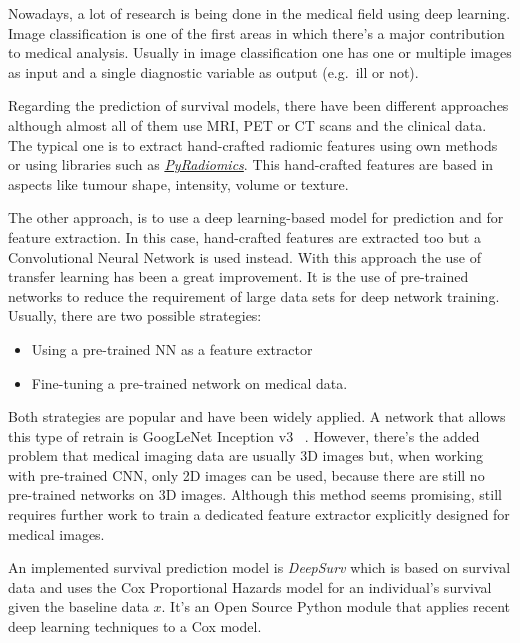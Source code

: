 Nowadays, a lot of research is being done in the medical field using deep learning. Image
classification is one of the first areas in which there's a major contribution to medical analysis.
Usually in image classification one has one or multiple images as input and a single diagnostic 
variable as output (e.g.~ill or not).
~\cite{medical:survey-deep-learning}

Regarding the prediction of survival models, there have been different approaches although
almost all of them use MRI, PET or CT scans and the clinical data. The typical one is to extract
hand-crafted radiomic features using own methods or using libraries such as
\href{https://github.com/Radiomics/pyradiomics}{\emph{PyRadiomics}}. This hand-crafted 
features are based in aspects like tumour shape, intensity, volume or texture.
~\cites{medical:tumour-radiomics}{medical:PyRadiomics}

The other approach, is to use a deep learning-based model for prediction and for feature
extraction. In this case, hand-crafted features are extracted too but a Convolutional
Neural Network is used instead. With this approach the use of transfer learning has been a
great improvement. It is the use of pre-trained networks to reduce the requirement of large data
sets for deep network training. Usually, there are two possible strategies: 
\begin{itemize}[noitemsep, topsep=0pt]
  \item Using a pre-trained NN as a feature extractor
  \item Fine-tuning a pre-trained network on medical data.
\end{itemize}

Both strategies are popular and have been widely applied. A network that allows this type
of retrain is GoogLeNet Inception v3
~\cites{neural:GoogLeNet}{neural:NNRetrain}{neural:inceptionRetrain}.
However, there's the added problem that medical imaging data are usually 3D images but, 
when working with pre-trained CNN, only 2D images can be used, because there are still no 
pre-trained networks on 3D images. Although this method seems promising, still requires 
further work to train a dedicated feature extractor explicitly designed for medical images.
~\cite{medical:deep-learning-radiomics-gbm}

An implemented survival prediction model is \emph{DeepSurv} which is based on survival data
and uses the Cox Proportional Hazards model for an individual's survival given the baseline data
\( x \). It's an Open Source Python module that applies recent deep learning techniques 
to a Cox model.
~\cites{medical:DeepSurv}{medical:Cox}

